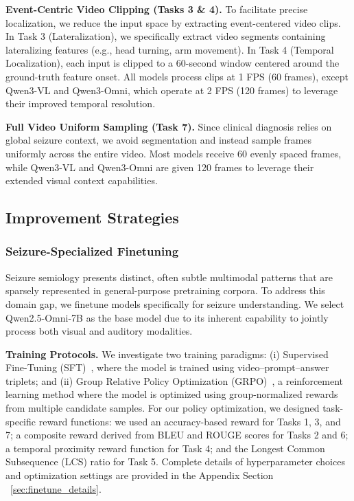 \documentclass{article}
\theoremstyle{plain}
\theoremstyle{definition}
\theoremstyle{remark}
\begin{document}
\textbf{Event-Centric Video Clipping (Tasks 3 \& 4).} To facilitate precise localization, we reduce the input space by extracting event-centered video clips. In Task 3 (Lateralization), we specifically extract video segments containing lateralizing features (e.g., head turning, arm movement). In Task 4 (Temporal Localization), each input is clipped to a 60-second window centered around the ground-truth feature onset. All models process clips at 1 FPS (60 frames), except Qwen3-VL and Qwen3-Omni, which operate at 2 FPS (120 frames) to leverage their improved temporal resolution.

\textbf{Full Video Uniform Sampling (Task 7).} Since clinical diagnosis relies on global seizure context, we avoid segmentation and instead sample frames uniformly across the entire video. Most models receive 60 evenly spaced frames, while Qwen3-VL and Qwen3-Omni are given 120 frames to leverage their extended visual context capabilities.
\fi

\subsection{Improvement Strategies}

\subsubsection{Seizure-Specialized Finetuning}
\label{subsec:fine_tune}
Seizure semiology presents distinct, often subtle multimodal patterns that are sparsely represented in general-purpose pretraining corpora. To address this domain gap, we finetune models specifically for seizure understanding. We select Qwen2.5-Omni-7B as the base model due to its inherent capability to jointly process both visual and auditory modalities.


\textbf{Training Protocols.} We investigate two training paradigms: (i) Supervised Fine-Tuning (SFT)~\cite{ouyang2022training, zhao2023survey}, where the model is trained using video–prompt–answer triplets; and (ii) Group Relative Policy Optimization (GRPO)~\cite{Shao2024DeepSeekMath}, a reinforcement learning method where the model is optimized using group-normalized rewards from multiple candidate samples.
For our policy optimization, we designed task-specific reward functions: we used an accuracy-based reward for Tasks 1, 3, and 7; a composite reward derived from BLEU and ROUGE scores for Tasks 2 and 6; a temporal proximity reward function for Task 4; and the Longest Common Subsequence (LCS) ratio for Task 5. Complete details of hyperparameter choices and optimization settings are provided in the Appendix Section ~\ref{sec:finetune_details}.
\end{document}
